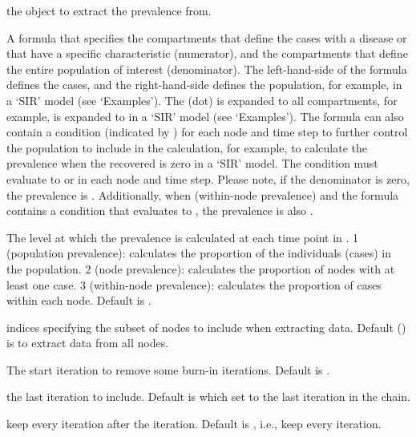 \documentclass[letterpaper]{book}
\begin{document}
\begin{Arguments}
\begin{ldescription}
\item[\code{model}] the  object to extract the
prevalence from.

\item[\code{formula}] A formula that specifies the compartments that
define the cases with a disease or that have a specific
characteristic (numerator), and the compartments that define
the entire population of interest (denominator). The
left-hand-side of the formula defines the cases, and the
right-hand-side defines the population, for example,
 in a `SIR' model (see
`Examples'). The   (dot) is expanded to all
compartments, for example,   is expanded to
 in a `SIR' model (see
`Examples'). The formula can also contain a condition
(indicated by \code{|}) for each node and time step to further
control the population to include in the calculation, for
example,  to calculate the prevalence
when the recovered is zero in a `SIR' model. The
condition must evaluate to  or  in each
node and time step. Please note, if the denominator is zero,
the prevalence is . Additionally, when
 (within-node prevalence) and the formula
contains a condition that evaluates to , the
prevalence is also .

\item[\code{level}] The level at which the prevalence is calculated at
each time point in . 1 (population prevalence):
calculates the proportion of the individuals (cases) in the
population. 2 (node prevalence): calculates the proportion of
nodes with at least one case. 3 (within-node prevalence):
calculates the proportion of cases within each node. Default
is .

\item[\code{index}] indices specifying the subset of nodes to include
when extracting data. Default () is to
extract data from all nodes.

\item[\code{start}] The start iteration to remove some burn-in
iterations. Default is .

\item[\code{end}] the last iteration to include. Default is 
which set  to the last iteration in the chain.

\item[\code{thin}] keep every  iteration after the
 iteration. Default is , i.e., keep
every iteration.
\end{ldescription}
\end{Arguments}
\end{document}
